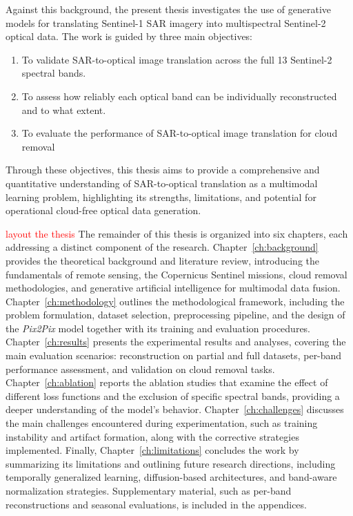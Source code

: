 Against this background, the present thesis investigates the use of generative models for translating Sentinel-1 SAR imagery into multispectral Sentinel-2 optical data. The work is guided by three main objectives:
\begin{enumerate}
    \item To validate SAR-to-optical image translation across the full 13 Sentinel-2 spectral bands. 
    \item To assess how reliably each optical band can be individually reconstructed and to what extent.
    \item To evaluate the performance of SAR-to-optical image translation for cloud removal
\end{enumerate}

Through these objectives, this thesis aims to provide a comprehensive and quantitative understanding of SAR-to-optical translation as a multimodal learning problem, highlighting its strengths, limitations, and potential for operational cloud-free optical data generation.

\bigskip
\textcolor{red}{layout the thesis}
The remainder of this thesis is organized into six chapters, each addressing a distinct component of the research.
Chapter~\ref{ch:background} provides the theoretical background and literature review, introducing the fundamentals of remote sensing, the Copernicus Sentinel missions, cloud removal methodologies, and generative artificial intelligence for multimodal data fusion.
Chapter~\ref{ch:methodology} outlines the methodological framework, including the problem formulation, dataset selection, preprocessing pipeline, and the design of the \textit{Pix2Pix} model together with its training and evaluation procedures.
Chapter~\ref{ch:results} presents the experimental results and analyses, covering the main evaluation scenarios: reconstruction on partial and full datasets, per-band performance assessment, and validation on cloud removal tasks.
Chapter~\ref{ch:ablation} reports the ablation studies that examine the effect of different loss functions and the exclusion of specific spectral bands, providing a deeper understanding of the model’s behavior.
Chapter~\ref{ch:challenges} discusses the main challenges encountered during experimentation, such as training instability and artifact formation, along with the corrective strategies implemented.
Finally, Chapter~\ref{ch:limitations} concludes the work by summarizing its limitations and outlining future research directions, including temporally generalized learning, diffusion-based architectures, and band-aware normalization strategies.
Supplementary material, such as per-band reconstructions and seasonal evaluations, is included in the appendices.

